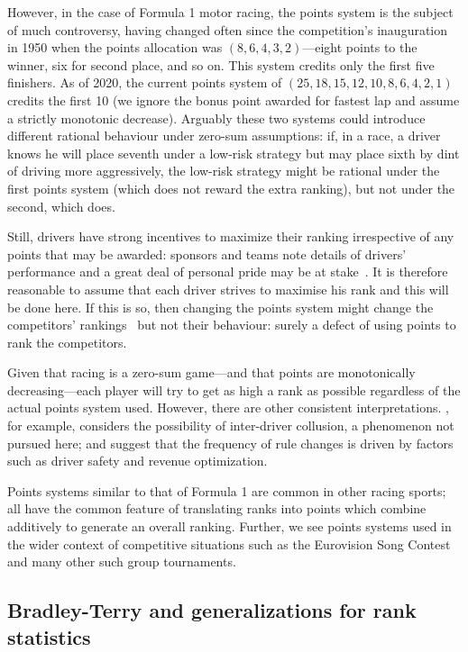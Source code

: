 \documentclass[a4,12pt]{article}
\begin{document}
However, in the case of Formula 1 motor racing, the points system is
the subject of much controversy, having changed often since the
competition's inauguration in 1950 when the points allocation was
$(8,6,4,3,2)$---eight points to the winner, six for second place, and
so on.  This system credits only the first five finishers.  As of
2020, the current points system of $(25,18,15,12,10,8,6,4,2,1)$
credits the first 10 (we ignore the bonus point awarded for fastest
lap and assume a strictly monotonic decrease).  Arguably these two
systems could introduce different rational behaviour under zero-sum
assumptions: if, in a race, a driver knows he will place seventh under
a low-risk strategy but may place sixth by dint of driving more
aggressively, the low-risk strategy might be rational under the first
points system (which does not reward the extra ranking), but not under
the second, which does.

Still, drivers have strong incentives to maximize their ranking
irrespective of any points that may be awarded: sponsors and teams
note details of drivers' performance and a great deal of personal
pride may be at stake~\citep{gayrees2019}.  It is therefore reasonable
to assume that each driver strives to maximise his rank and this will
be done here.  If this is so, then changing the points system might
change the competitors' rankings~\citep{wood2020} but not their
behaviour: surely a defect of using points to rank the competitors.

Given that racing is a zero-sum game---and that points are
monotonically decreasing---each player will try to get as high a rank
as possible regardless of the actual points system used.  However,
there are other consistent interpretations. \cite{bakhrankova2011},
for example, considers the possibility of inter-driver collusion, a
phenomenon not pursued here; and \cite{mastromarco2009} suggest that
the frequency of rule changes is driven by factors such as driver
safety and revenue optimization.

Points systems similar to that of Formula 1 are common in other racing
sports; all have the common feature of translating ranks into points
which combine additively to generate an overall ranking.  Further, we
see points systems used in the wider context of competitive situations
such as the Eurovision Song Contest and many other such group
tournaments.

\subsection{Bradley-Terry and generalizations for rank
statistics}\label{bradley-terry-and-generalizations-for-rank-statistics}
\end{document}
